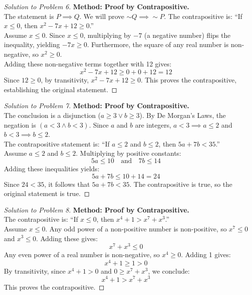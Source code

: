 \documentclass[11pt]{article}
\begin{document}
\begin{proof}[Solution to Problem 6]
    \textbf{Method: Proof by Contrapositive.} \\
    The statement is $P \implies Q$. We will prove $\sim Q \implies \sim P$. The contrapositive is: ``If $x \le 0$, then $x^2 - 7x + 12 \ge 0$.'' \\
    Assume $x \le 0$. Since $x \le 0$, multiplying by $-7$ (a negative number) flips the inequality, yielding $-7x \ge 0$. Furthermore, the square of any real number is non-negative, so $x^2 \ge 0$. \\
    Adding these non-negative terms together with 12 gives:
    \[ x^2 - 7x + 12 \ge 0 + 0 + 12 = 12 \]
    Since $12 \ge 0$, by transitivity, $x^2 - 7x + 12 \ge 0$. This proves the contrapositive, establishing the original statement.
\end{proof}

\begin{proof}[Solution to Problem 7]
    \textbf{Method: Proof by Contrapositive.} \\
    The conclusion is a disjunction ($a \ge 3 \lor b \ge 3$). By De Morgan's Laws, the negation is $(a < 3 \land b < 3)$. Since $a$ and $b$ are integers, $a < 3 \implies a \le 2$ and $b < 3 \implies b \le 2$. \\
    The contrapositive statement is: ``If $a \le 2$ and $b \le 2$, then $5a + 7b < 35$.'' \\
    Assume $a \le 2$ and $b \le 2$. Multiplying by positive constants:
    \[ 5a \le 10 \quad \text{and} \quad 7b \le 14 \]
    Adding these inequalities yields:
    \[ 5a + 7b \le 10 + 14 = 24 \]
    Since $24 < 35$, it follows that $5a + 7b < 35$. The contrapositive is true, so the original statement is true.
\end{proof}

\begin{proof}[Solution to Problem 8]
    \textbf{Method: Proof by Contrapositive.} \\
    The contrapositive is: ``If $x \le 0$, then $x^4 + 1 > x^7 + x^3$.'' \\
    Assume $x \le 0$. Any odd power of a non-positive number is non-positive, so $x^7 \le 0$ and $x^3 \le 0$. Adding these gives:
    \[ x^7 + x^3 \le 0 \]
    Any even power of a real number is non-negative, so $x^4 \ge 0$. Adding 1 gives:
    \[ x^4 + 1 \ge 1 > 0 \]
    By transitivity, since $x^4 + 1 > 0$ and $0 \ge x^7 + x^3$, we conclude:
    \[ x^4 + 1 > x^7 + x^3 \]
    This proves the contrapositive.
\end{proof}
\end{document}
